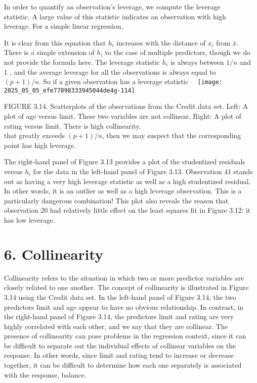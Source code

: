 \documentclass[10pt]{article}
\begin{document}
In order to quantify an observation's leverage, we compute the leverage\\
statistic. A large value of this statistic indicates an observation with high leverage. For a simple linear regression,

It is clear from this equation that $h_{i}$ increases with the distance of $x_{i}$ from $\bar{x}$. There is a simple extension of $h_{i}$ to the case of multiple predictors, though we do not provide the formula here. The leverage statistic $h_{i}$ is always between $1 / n$ and 1 , and the average leverage for all the observations is always equal to $(p+1) / n$. So if a given observation has a leverage statistic\
\
\texttt{[image: 2025\_05\_05\_efe77898333945044de4g-114]}

FIGURE 3.14. Scatterplots of the observations from the Credit data set. Left: A plot of age versus limit. These two variables are not collinear. Right: A plot of rating versus limit. There is high collinearity.\\
that greatly exceeds $(p+1) / n$, then we may suspect that the corresponding point has high leverage.

The right-hand panel of Figure 3.13 provides a plot of the studentized residuals versus $h_{i}$ for the data in the left-hand panel of Figure 3.13. Observation 41 stands out as having a very high leverage statistic as well as a high studentized residual. In other words, it is an outlier as well as a high leverage observation. This is a particularly dangerous combination! This plot also reveals the reason that observation 20 had relatively little effect on the least squares fit in Figure 3.12: it has low leverage.

\section*{6. Collinearity}
Collinearity refers to the situation in which two or more predictor variables are closely related to one another. The concept of collinearity is illustrated in Figure 3.14 using the Credit data set. In the left-hand panel of Figure 3.14, the two predictors limit and age appear to have no obvious relationship. In contrast, in the right-hand panel of Figure 3.14, the predictors limit and rating are very highly correlated with each other, and we say that they are collinear. The presence of collinearity can pose problems in the regression context, since it can be difficult to separate out the individual effects of collinear variables on the response. In other words, since limit and rating tend to increase or decrease together, it can be difficult to determine how each one separately is associated with the response, balance.
\end{document}
